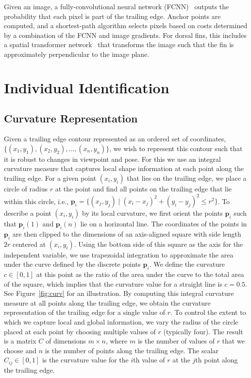 \documentclass[10pt,twocolumn,letterpaper]{article}
\begin{document}
Given an image, a fully-convolutional neural network (FCNN)~\cite{Long15}
outputs the probability that each pixel is part of the trailing edge.  Anchor
points are computed, and a shortest-path algorithm selects pixels based
on costs determined by a combination of the FCNN and image gradients.
For dorsal fins, this includes a spatial transformer network~\cite{Jaderberg15}
that transforms the image such that the fin is approximately perpendicular to
the image plane.

\section{Individual Identification}

\subsection{Curvature Representation}
\label{subsec:curvature-representation}
Given a trailing edge contour represented as an ordered set of coordinates,
$\{(x_1, y_1), (x_2, y_2), \ldots, (x_n, y_n)\}$, we wish to represent this
contour such that it is robust to changes in viewpoint and pose.  For this we
use an integral curvature measure that captures local shape information at each
point along the trailing edge.  For a given point $(x_i, y_i)$ that lies on the
trailing edge, we place a circle of radius $r$ at the point and find all points
on the trailing edge that lie within this circle, i.e., $\mathbf{p}_i = \{(x_j,
y_j) \mid (x_i - x_j)^2 + (y_i - y_j)^2 \leq r^2\}$.  To describe a point
$(x_i, y_i)$  by its local curvature, we first orient the points $\mathbf{p}_i$
such that $\mathbf{p}_i(1)$ and $\mathbf{p}_i(n)$ lie on a horizontal line.
The coordinates of the points in $\mathbf{p}_i$ are then clipped to the
dimensions of an axis-aligned square with side length $2r$ centered at $(x_i,
y_i)$.  Using the bottom side of this square as the axis for the independent
variable, we use trapezoidal integration to approximate the area under the
curve defined by the discrete points $\mathbf{p}_i$.  We define the curvature
$c \in [0, 1]$ at this point as the ratio of the area under the curve to the
total area of the square, which implies that the curvature value for a straight
line is $c = 0.5$.  See Figure~\ref{fig:curv} for an illustration. By
computing this integral curvature measure at all points along the trailing
edge, we obtain the curvature representation of the trailing edge for a single
value of $r$.  To control the extent to which we capture local and global
information, we vary the radius of the circle placed at each point by choosing
multiple values of $r$ (typically four).  The result is a matrix $C$ of dimensions $m \times n$,
where $m$ is the number of values of $r$ that we choose and
$n$ is the number of points along the trailing edge.  The scalar $C_{ij} \in
[0, 1]$ is the curvature value for the $i$th value of $r$ at the $j$th point
along the trailing edge.
\end{document}
